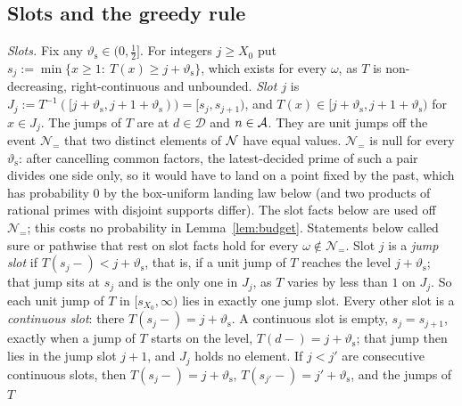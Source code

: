 \subsection{Slots and the greedy rule}\label{sec:greedy}
\emph{Slots.} Fix any $\vartheta_{\mathrm s}\in(0,\tfrac12]$. For integers $j\ge X_0$ put $s_j:=\min\{x\ge1:\ T(x)\ge j+\vartheta_{\mathrm s}\}$,
which exists for every $\omega$, as $T$ is non-decreasing, right-continuous and unbounded. \emph{Slot $j$} is
$J_j:=T^{-1}([j+\vartheta_{\mathrm s},j+1+\vartheta_{\mathrm s}))=[s_j,s_{j+1})$, and $T(x)\in[j+\vartheta_{\mathrm s},j+1+\vartheta_{\mathrm s})$ for
$x\in J_j$. The jumps of $T$ are at $d\in\mathcal D$ and $n\in\mathcal{A}$. They are unit jumps off the event $\mathcal N_{=}$ that two distinct
elements of $\mathcal{N}$ have equal values. $\mathcal N_{=}$ is null for every $\vartheta_{\mathrm s}$: after cancelling common factors, the latest-decided
prime of such a pair divides one side only, so it would have to land on a point fixed by the past, which has probability $0$ by the
box-uniform landing law below (and two products of rational primes with disjoint supports differ). The slot facts below are used
off $\mathcal N_{=}$; this costs no probability in Lemma~\ref{lem:budget}. Statements below called sure or pathwise that rest on slot
facts hold for every $\omega\notin\mathcal N_{=}$. Slot $j$ is a \emph{jump slot} if $T(s_j-)<j+\vartheta_{\mathrm s}$, that is, if a unit jump of $T$
reaches the level $j+\vartheta_{\mathrm s}$; that jump sits at $s_j$ and is the only one in $J_j$, as $T$ varies by less than $1$ on $J_j$. So
each unit jump of $T$ in $[s_{X_0},\infty)$ lies in exactly one jump slot. Every other slot is a \emph{continuous slot}: there $T(s_j-)=j+\vartheta_{\mathrm s}$. A
continuous slot is empty, $s_j=s_{j+1}$, exactly when a jump of $T$ starts on the level, $T(d-)=j+\vartheta_{\mathrm s}$; that jump then
lies in the jump slot $j+1$, and $J_j$ holds no element. If $j<j'$ are consecutive continuous slots, then $T(s_j-)=j+\vartheta_{\mathrm s}$, $T(s_{j'}-)=j'+\vartheta_{\mathrm s}$, and the jumps of $T$
